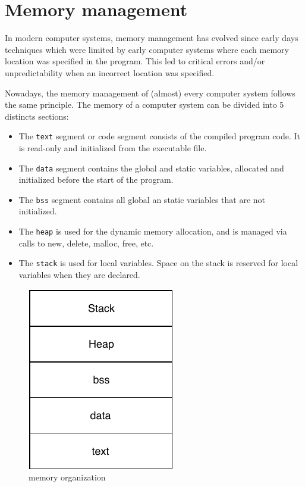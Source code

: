 \section{Memory management}


In modern computer systems, memory management has evolved since early days techniques which were limited
    by early computer systems where each memory location was specified in the program.
This led to critical errors and/or unpredictability when an incorrect location was specified.

Nowadays, the memory management of (almost) every computer system follows the same principle.
The memory of a computer system can be divided into 5 distincts sections:
\begin{itemize}
    \item The \texttt{text} segment or code segment consists of the compiled program code. It is read-only and initialized from the executable file.
    \item The \texttt{data} segment contains the global and static variables, allocated and initialized before the start of the program.
    \item The \texttt{bss} segment contains all global an static variables that are not initialized.
    \item The \texttt{heap} is used for the dynamic memory allocation, and is managed via calls to new, delete, malloc, free, etc.
    \item The \texttt{stack} is used for local variables. Space on the stack is reserved for local variables when they are declared.
\end{itemize}

\begin{figure}[!h]
    \centering
    \includegraphics[]{assets/memory.pdf}
    \caption{\label{fig:kernel-types}memory organization}
\end{figure}

